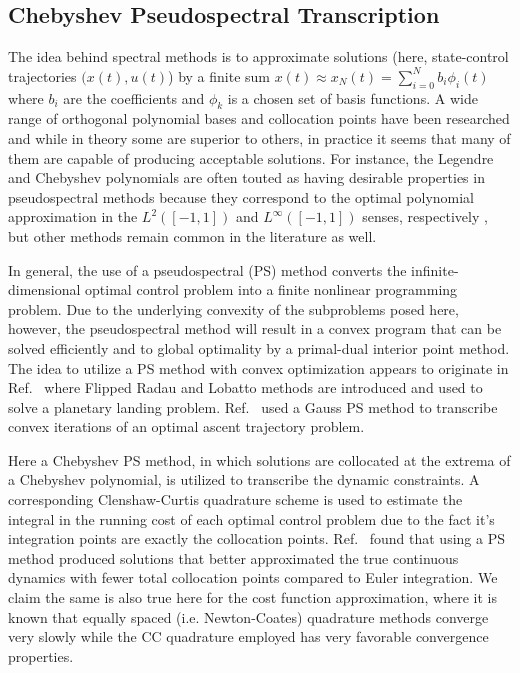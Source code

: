 \documentclass[10pt,a4paper]{article}
\begin{document}
		
		
	

	
	\subsection{Chebyshev Pseudospectral Transcription}
	The idea behind spectral methods is to approximate solutions (here, state-control trajectories $ (x(t),u(t) $) by a finite sum $x(t) \approx x_N(t) = \sum_{i=0}^{N}b_i\phi_i(t)$ where $b_i$ are the coefficients and $ {\phi_k} $ is a chosen set of basis functions. A wide range of orthogonal polynomial bases and collocation points have been researched \cite{ChebyPS,LegendrePS,RadauPS,GPOPS} and while in theory some are superior to others, in practice it seems that many of them are capable of producing acceptable solutions. For instance, the Legendre and Chebyshev polynomials are often touted as having desirable properties in pseudospectral methods because they correspond to the optimal polynomial approximation in the $L^2([-1,1])$ and $L^\infty([-1,1])$ senses, respectively \cite{Polynomials}, but other methods remain common in the literature as well.
	
	In general, the use of a pseudospectral (PS) method converts the infinite-dimensional optimal control problem into a finite nonlinear programming problem. Due to the underlying convexity of the subproblems posed here, however, the pseudospectral method will result in a convex program that can be solved efficiently and to global optimality by a primal-dual interior point method. The idea to utilize a PS method with convex optimization appears to originate in Ref.~\cite{PS_Convex} where Flipped Radau and Lobatto methods are introduced and used to solve a planetary landing problem. Ref.~\cite{PS_Convex_ascent} used a Gauss PS method to transcribe convex iterations of an optimal ascent trajectory problem. 
	
	Here a Chebyshev PS method, in which solutions are collocated at the extrema of a Chebyshev polynomial, is utilized to transcribe the dynamic constraints. A corresponding Clenshaw-Curtis quadrature scheme is used to estimate the integral in the running cost of each optimal control problem due to the fact it's integration points are exactly the collocation points.\cite{CCQuad} Ref.~\cite{PS_Convex} found that using a PS method produced solutions that better approximated the true continuous dynamics with fewer total collocation points compared to Euler integration. We claim the same is also true here for the cost function approximation, where it is known that equally spaced (i.e. Newton-Coates) quadrature methods converge very slowly while the CC quadrature employed has very favorable convergence properties.
	
\end{document}
